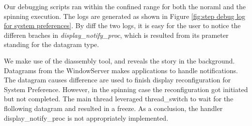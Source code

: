 Our debugging scripts ran within the confined range for both the noraml and the
spinning execution.  The logs are generated as shown in Figure \ref{fig:step
debug log for system preferences}.  By diff the two logs, it is easy for the
user to notice the differen braches in \textit{display\_notify\_proc}, which is
resulted from its prameter standing for the datagram type.

We make use of the diassembly tool, and reveals the story in the background.
Datagrams from the WindowServer makes applications to handle notifications.
The datagram causes difference are used to finish display reconfiguration for
System Preference.  However, in the spinning case the reconfiguration got
initiated but not completed.  The main thread leveraged thread\_switch to wait
for the flollowing datagram and resulted in a freeze.  As a conclusion, the
handler display\_notify\_proc is not appropriately implemented.
